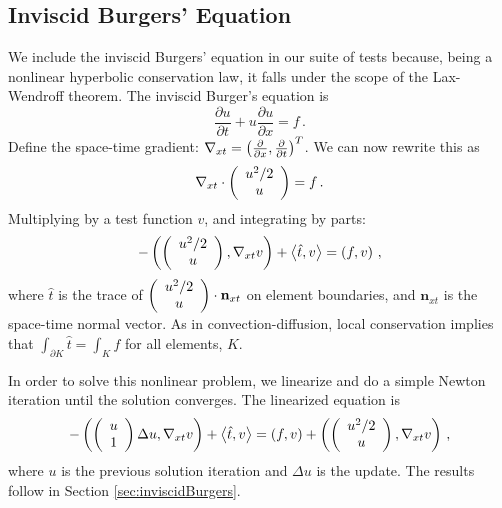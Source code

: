 \documentclass[Proposal.tex]{subfiles}
\begin{document}
\subsection{Inviscid Burgers' Equation}
We include the inviscid Burgers' equation in our suite of tests because, being
a nonlinear hyperbolic conservation law, it
falls under the scope of the Lax-Wendroff theorem. %
The inviscid Burger's equation is
\[
\frac{\partial u}{\partial t}+u\frac{\partial u}{\partial x}=f\,.
\]
Define the space-time gradient: $\nabla_{xt}=\left( \frac{\partial}{\partial
x},\frac{\partial}{\partial t} \right)^T$. We can now rewrite this as
\[
\nabla_{xt}\cdot\left( \begin{array}{c} u^2/2\\ u\\ \end{array} \right)=f\,.
\]
Multiplying by a test function $v$, and integrating by parts:
\[
-\left( \left( \begin{array}{c} u^2/2\\ u\\ \end{array} \right),\nabla_{xt}v \right)+\left\langle \hat t,v \right\rangle=\left( f,v \right)\,,
\]
where $\hat t$ is the trace of $\left( \begin{array}{c} u^2/2\\ u\\ \end{array} \right)\cdot\mathbf{n}_{xt}$ on
element boundaries, and $\mathbf{n}_{xt}$ is the space-time normal vector.
As in convection-diffusion, local conservation implies that
$\int_{\partial K}\hat t=\int_Kf$ for all elements, $K$.

In order to solve this nonlinear problem, we linearize and do a simple Newton iteration
until the solution converges. The linearized equation is
\[
-\left( \left( \begin{array}{c} u\\ 1\\ \end{array} \right)\Delta u,\nabla_{xt}v \right)+\left\langle \hat t,v \right\rangle=\left( f,v \right)
+\left( \left( \begin{array}{c} u^2/2\\ u\\ \end{array} \right),\nabla_{xt}v \right) \,,
\]
where $u$ is the previous solution iteration and $\Delta u$ is the update.
The results follow in Section \ref{sec:inviscidBurgers}.
\end{document}
